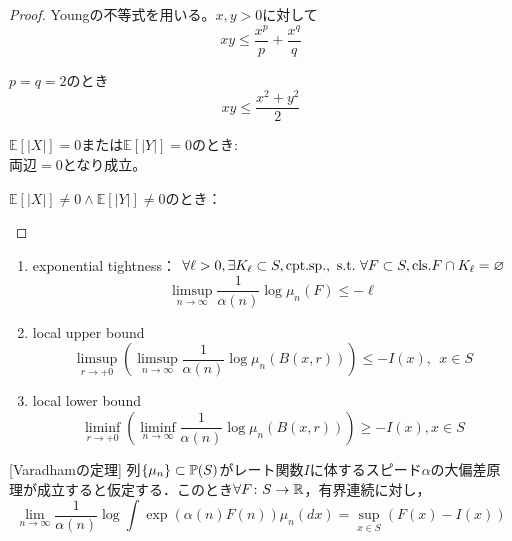 \documentclass[dvipdfmx, leqno]{jsbook}
\begin{document}
\begin{proof}
    Youngの不等式を用いる。$x, y> 0$に対して
\begin{equation}
    xy\le \frac{x^p}{p}+ \frac{x^q}{q}
\end{equation}

    $p= q= 2$のとき
\begin{equation}
    xy\le \frac{x^2+ y^2}{2}
\end{equation}

\begin{enumerate_roman}
    \item $\mathbb{E}[|X|]= 0$または$\mathbb{E}[|Y|]= 0$のとき:\\
    両辺$= 0$となり成立。
    \item $\mathbb{E}[|X|]\ne 0\land \mathbb{E}[|Y|]\ne 0$のとき：\\

\end{enumerate_roman}
\end{proof}

\begin{enumerate}
    \item exponential tightness：
    $\forall \ell> 0, \exists K_\ell\subset S, \mathrm{cpt. sp.}, \st\forall F\subset S, \mathrm{cls.} F\cap K_\ell= \emptyset$
\begin{equation}
    \limsup_{n\to \infty}\frac{1}{\alpha(n)}\log\mu_n(F)\le -\ell
\end{equation}
    \item local upper bound
\begin{equation}
    \limsup_{r\to +0}\left(\limsup_{n\to \infty} \frac{1}{\alpha(n)}\log\mu_n(B(x, r))\right)\le -I(x),\ \ x\in S
\end{equation}
    \item local lower bound
\begin{equation}
    \liminf_{r\to +0}\left(\liminf_{n\to \infty} \frac{1}{\alpha(n)}\log\mu_n(B(x, r))\right)\ge -I(x), x\in S
\end{equation}
\end{enumerate}

[Varadhamの定理]
    列$\{\mu_n\}\subset \P(S)$がレート関数$I$に体するスピード$\alpha$の大偏差原理が成立すると仮定する．このとき$\forall F\colon S\to \R$，有界連続に対し，
\begin{equation}
    \lim_{n\to \infty}\frac{1}{\alpha(n)}\log\int \exp{(\alpha(n)F(n))}\mu_n(dx)= \sup_{x\in S}(F(x)- I(x))
\end{equation}
\end{document}
